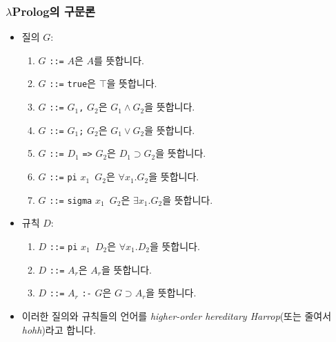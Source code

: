 \documentclass[slidestop,compress,mathserif]{beamer}
\begin{document}
    \begin{frame}
        \frametitle{$\lambda$Prolog의 구문론}
        \begin{itemize}
            \item 질의 $G$:
            \begin{enumerate}
                \item $G$ \texttt{::=} $A$은 $A$를 뜻합니다.
                \item $G$ \texttt{::=} \texttt{true}은 $\top$을 뜻합니다.
                \item $G$ \texttt{::=} $G_1$\texttt{,} $G_2$은 $G_1 \land G_2$을 뜻합니다.
                \item $G$ \texttt{::=} $G_1$\texttt{;} $G_2$은 $G_1 \lor G_2$을 뜻합니다.
                \item $G$ \texttt{::=} $D_1$ \texttt{=>} $G_2$은 $D_1 \supset G_2$을 뜻합니다.
                \item $G$ \texttt{::=} \texttt{pi} $x_1$\texttt{\string\ }$G_2$은 $\forall x_1 . G_2$을 뜻합니다.
                \item $G$ \texttt{::=} \texttt{sigma} $x_1$\texttt{\string\ }$G_2$은 $\exists x_1 . G_2$을 뜻합니다.
            \end{enumerate}
            \item 규칙 $D$:
            \begin{enumerate}
                \item $D$ \texttt{::=} \texttt{pi} $x_1$\texttt{\string\ }$D_2$은 $\forall x_1 . D_2$을 뜻합니다.
                \item $D$ \texttt{::=} $A_r$은 $A_r$을 뜻합니다.
                \item $D$ \texttt{::=} $A_r$ \texttt{:-} $G$은 $G \supset A_r$을 뜻합니다.
            \end{enumerate}
            \item 이러한 질의와 규칙들의 언어를 \textit{higher-order hereditary Harrop}(또는 줄여서 \textit{hohh})라고 합니다.
        \end{itemize}
    \end{frame}
\end{document}
